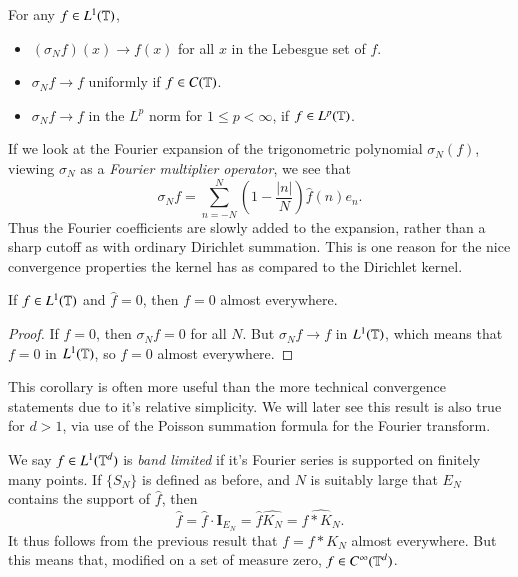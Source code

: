 \begin{theorem} For any $f \in L^1(\operatorname{\mathbb{T}})$,
    \begin{itemize}
        \item $(\sigma_N f)(x) \to f(x)$ for all $x$ in the Lebesgue set of $f$.
        \item $\sigma_N f \to f$ uniformly if $f \in C(\operatorname{\mathbb{T}})$.
        \item $\sigma_N f \to f$ in the $L^p$ norm for $1 \leq p < \infty$, if $f \in L^p(\operatorname{\mathbb{T}})$.
    \end{itemize}

\end{theorem}

If we look at the Fourier expansion of the trigonometric polynomial $\sigma_N(f)$, viewing $\sigma_N$ as a \emph{Fourier multiplier operator}, we see that
%
\[ \sigma_N f = \sum_{n = -N}^N \left( 1 - \frac{|n|}{N} \right) \widehat{f}(n) e_n. \]
%
Thus the Fourier coefficients are slowly added to the expansion, rather than a sharp cutoff as with ordinary Dirichlet summation. This is one reason for the nice convergence properties the kernel has as compared to the Dirichlet kernel.

\begin{corollary}
    If $f \in L^1(\operatorname{\mathbb{T}})$ and $\widehat{f} = 0$, then $f = 0$ almost everywhere.
\end{corollary}
\begin{proof}
    If $\widehat{f} = 0$, then $\sigma_N f = 0$ for all $N$. But $\sigma_N f \to f$ in $L^1(\operatorname{\mathbb{T}})$, which means that $f = 0$ in $L^1(\operatorname{\mathbb{T}})$, so $f = 0$ almost everywhere.
\end{proof}

This corollary is often more useful than the more technical convergence statements due to it's relative simplicity. We will later see this result is also true for $d > 1$, via use of the Poisson summation formula for the Fourier transform.

\begin{example}
    We say $f \in L^1(\operatorname{\mathbb{T}}^d)$ is \emph{band limited} if it's Fourier series is supported on finitely many points. If $\{ S_N \}$ is defined as before, and $N$ is suitably large that $E_N$ contains the support of $\widehat{f}$, then
    \[ \widehat{f} = \widehat{f} \cdot \mathbf{I}_{E_N} = \widehat{f} \widehat{K_N} = \widehat{f * K_N}. \]
    It thus follows from the previous result that $f = f * K_N$ almost everywhere. But this means that, modified on a set of measure zero, $f \in C^\infty(\operatorname{\mathbb{T}}^d)$.
\end{example}

